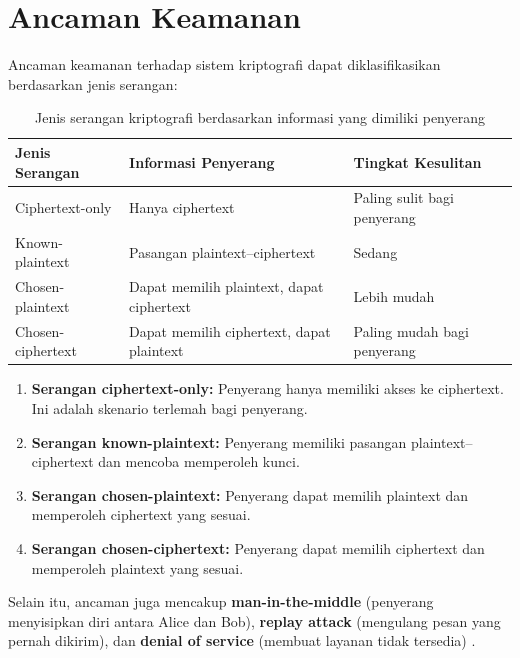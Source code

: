 \section{Ancaman Keamanan}

Ancaman keamanan terhadap sistem kriptografi dapat diklasifikasikan berdasarkan jenis serangan:

\begin{table}[!htbp]
\centering
\caption{Jenis serangan kriptografi berdasarkan informasi yang dimiliki penyerang}
\label{tab:jenis-serangan}
\begin{tabular}{@{}>{\raggedright\arraybackslash}p{}>{\raggedright\arraybackslash}p{}>{\raggedright\arraybackslash}p{}@{}}
\toprule
\textbf{Jenis Serangan} & \textbf{Informasi Penyerang} & \textbf{Tingkat Kesulitan} \\
\midrule
Ciphertext-only & Hanya ciphertext & Paling sulit bagi penyerang \\
Known-plaintext & Pasangan plaintext--ciphertext & Sedang \\
Chosen-plaintext & Dapat memilih plaintext, dapat ciphertext & Lebih mudah \\
Chosen-ciphertext & Dapat memilih ciphertext, dapat plaintext & Paling mudah bagi penyerang \\
\bottomrule
\end{tabular}
\end{table}

\begin{enumerate}
\item \textbf{Serangan ciphertext-only:} Penyerang hanya memiliki akses ke ciphertext. Ini adalah skenario terlemah bagi penyerang.
\item \textbf{Serangan known-plaintext:} Penyerang memiliki pasangan plaintext--ciphertext dan mencoba memperoleh kunci.
\item \textbf{Serangan chosen-plaintext:} Penyerang dapat memilih plaintext dan memperoleh ciphertext yang sesuai.
\item \textbf{Serangan chosen-ciphertext:} Penyerang dapat memilih ciphertext dan memperoleh plaintext yang sesuai.
\end{enumerate}

Selain itu, ancaman juga mencakup \textbf{man-in-the-middle} (penyerang menyisipkan diri antara Alice dan Bob), \textbf{replay attack} (mengulang pesan yang pernah dikirim), dan \textbf{denial of service} (membuat layanan tidak tersedia) \cite{menezes1996,schneier1996}.
